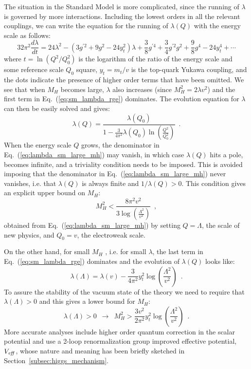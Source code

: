 \documentclass[11pt,prd,onecolumn,aps,floats,superscriptaddress,floatfix,nofootinbib]{revtex4-2}
\begin{document}
The situation in the Standard Model is more complicated, since the
running of $\lambda$ is governed by more interactions. Including the
lowest orders in all the relevant couplings, we can write the equation
for the running of $\lambda(Q)$ with the energy scale as follows:
\begin{equation}
\label{eq:sm_lambda_rge}
32\pi^2\frac{d\lambda}{dt}=
24\lambda^2-(3g^{\prime 2}+9g^2-24y_t^2)\lambda
+\frac{3}{8}g^{\prime 4}+\frac{3}{4}g^{\prime 2}g^2+\frac{9}{8}g^4
-24y_t^4+\cdots
\end{equation}
where $t\!=\!\ln(Q^2/Q_0^2)$ is the logarithm of the ratio of the
energy scale and some reference scale $Q_0$ square, $y_t\!=\!m_t/v$ is
the top-quark Yukawa coupling, and the dots indicate the presence of
higher order terms that have been omitted. We see that when $M_H$
becomes large, $\lambda$ also increases (since $M_H^2\!=\!2\lambda
v^2$) and the first term in Eq.~(\ref{eq:sm_lambda_rge})
dominates. The evolution equation for $\lambda$ can then be easily
solved and gives:
\begin{equation}
\label{eq:lambda_sm_large_mh}
\lambda(Q)=\frac{\lambda(Q_0)}{1-\frac{3}{4\pi^2}\lambda(Q_0)
\ln\left(\frac{Q^2}{Q_0^2}\right)}\,\,\,.
\end{equation}
When the energy scale $Q$ grows, the
denominator in Eq.~(\ref{eq:lambda_sm_large_mh}) may vanish, in which
case $\lambda(Q)$ hits a pole, becomes infinite, and a triviality
condition needs to be imposed. This is avoided imposing that the
denominator in Eq.~(\ref{eq:lambda_sm_large_mh}) never vanishes, i.e. 
that $\lambda(Q)$ is always finite
and $1/\lambda(Q)>0$. This condition gives an explicit upper bound on
$M_H$:
\begin{equation}
M_H^2<\frac{8\pi^2v^2}{3\log\left(\frac{\Lambda^2}{v^2}\right)}\,\,\,,
\end{equation}
obtained from Eq.~(\ref{eq:lambda_sm_large_mh}) by setting
$Q\!=\!\Lambda$, the scale of new physics, and $Q_0\!=\!v$, the
electroweak scale.

On the other hand, for small $M_H$ , i.e. for small $\lambda$, the
last term in Eq.~(\ref{eq:sm_lambda_rge}) dominates and the
evolution of $\lambda(Q)$ looks like:
\begin{equation}
\lambda(\Lambda)=\lambda(v)-\frac{3}{4\pi^2}y_t^2
\log\left(\frac{\Lambda^2}{v^2}\right)\,\,\,.
\end{equation}
To assure the stability of the vacuum state of the theory we need to
require that $\lambda(\Lambda)\!>\!0$ and this gives a lower bound for
$M_H$:
\begin{equation}
\lambda(\Lambda)>0 \,\,\,\longrightarrow \,\,\,
M_H^2>\frac{3v^2}{2\pi^2}y_t^2\log\left(\frac{\Lambda^2}{v^2}\right)\,\,\,.
\end{equation}
More accurate analyses include higher order quantum correction in the
scalar potential and use a 2-loop renormalization group improved
effective potential, $V_{\it eff}$, whose nature and meaning has been
briefly sketched in Section~\ref{subsec:higgs_mechanism}.
\end{document}
